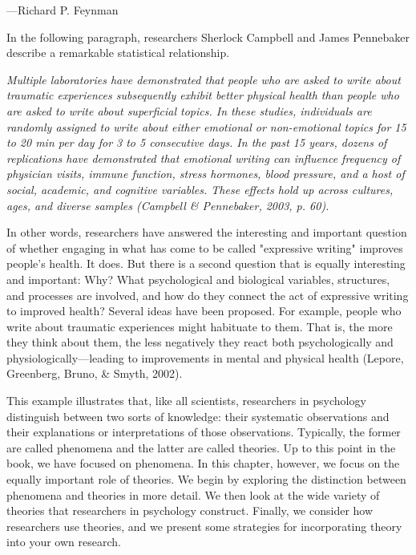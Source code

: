  {---Richard P. Feynman}

In the following paragraph, researchers Sherlock Campbell and James Pennebaker describe a remarkable statistical relationship.

\emph{Multiple laboratories have demonstrated that people who are asked to write about traumatic experiences subsequently exhibit better physical health than people who are asked to write about superficial topics. In these studies, individuals are randomly assigned to write about either emotional or non-emotional topics for 15 to 20 min per day for 3 to 5 consecutive days. In the past 15 years, dozens of replications have demonstrated that emotional writing can influence frequency of physician visits, immune function, stress hormones, blood pressure, and a host of social, academic, and cognitive variables. These effects hold up across cultures, ages, and diverse samples (Campbell \& Pennebaker, 2003, p. 60).}

In other words, researchers have answered the interesting and important question of whether engaging in what has come to be called "expressive writing" improves people's health. It does. But there is a second question that is equally interesting and important: Why? What psychological and biological variables, structures, and processes are involved, and how do they connect the act of expressive writing to improved health? Several ideas have been proposed. For example, people who write about traumatic experiences might habituate to them. That is, the more they think about them, the less negatively they react both psychologically and physiologically---leading to improvements in mental and physical health (Lepore, Greenberg, Bruno, \& Smyth, 2002).

This example illustrates that, like all scientists, researchers in psychology distinguish between two sorts of knowledge: their systematic observations and their explanations or interpretations of those observations. Typically, the former are called phenomena and the latter are called theories. Up to this point in the book, we have focused on phenomena. In this chapter, however, we focus on the equally important role of theories. We begin by exploring the distinction between phenomena and theories in more detail. We then look at the wide variety of theories that researchers in psychology construct. Finally, we consider how researchers use theories, and we present some strategies for incorporating theory into your own research.

